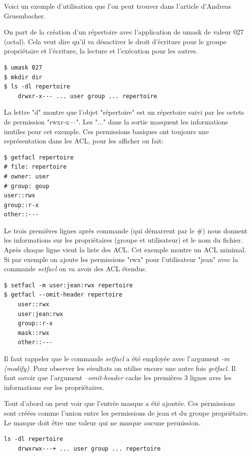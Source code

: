 \documentclass{article}
\begin{document}
Voici un exemple d'utilisation que l'on peut trouver dans l'article d'Andreas Gruembacher\cite{aclsuse}.

On part de la création d'un répertoire avec l'application de umask de valeur 027 (octal). Cela veut dire qu'il va désactiver le droit d'écriture pour le groupe propriétaire et l'écriture, la lecture et l'exécution pour les autres.

\begin{verbatim}
$ umask 027 
$ mkdir dir 
$ ls -dl repertoire
	drwxr-x--- ... user group ... repertoire
\end{verbatim}

La lettre "d" montre que l'objet "répertoire" est un répertoire suivi par les octets de permission "rwxr-x---". Les "..." dans la sortie masquent les informations inutiles pour cet exemple. Ces permissions basiques ont toujours une représentation dans les ACL, pour les afficher on fait:

\begin{verbatim}
$ getfacl repertoire
# file: repertoire 
# owner: user 
# group: goup
user::rwx
group::r-x
other::---
\end{verbatim}

Le trois premières lignes après commande (qui démarrent par le \#) nous donnent les informations sur les propriétaires (groupe et utilisateur) et le nom du fichier. Après chaque ligne vient la liste des ACL. Cet exemple montre un ACL minimal. Si par exemple on ajoute les permissions "rwx" pour l'utilisateur "jean" avec la commande \emph{setfacl} on va avoir des ACL étendus.

\begin{verbatim}
$ setfacl -m user:jean:rwx repertoire
$ getfacl --omit-header repertoire 
	user::rwx 
	user:jean:rwx	
	group::r-x 
	mask::rwx 
	other::---
\end{verbatim}

Il faut rappeler que le commande \emph{setfacl} a été employée avec l'argument \emph{-m (modify)}. Pour observer les résultats on utilise encore une autre fois \emph{getfacl}. Il faut savoir que l'argument \emph{--omit-header} cache les premières 3 lignes avec les informations sur les propriétaires.  

Tout d'abord on peut voir que l'entrée masque a été ajoutée. Ces permissions sont créées comme l'union entre les permissions de jean et du groupe propriétaire. Le masque doit être une valeur qui ne masque aucune permission.  

\begin{verbatim}
ls -dl repertoire
	drwxrwx---+ ... user group ... repertoire
\end{verbatim}
\end{document}
